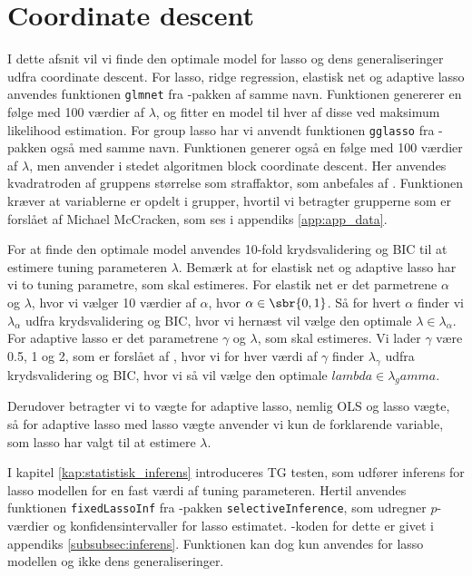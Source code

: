\section{Coordinate descent}
I dette afsnit vil vi finde den optimale model for lasso og dens generaliseringer udfra coordinate descent.
For lasso, ridge regression, elastisk net og adaptive lasso anvendes funktionen \texttt{glmnet} fra \Rlang-pakken af samme navn.
Funktionen genererer en følge med 100 værdier af $\lambda$, og fitter en model til hver af disse ved maksimum likelihood estimation.
For group lasso har vi anvendt funktionen \texttt{gglasso} fra \Rlang-pakken også med samme navn. 
Funktionen generer også en følge med 100 værdier af $\lambda$, men anvender i stedet algoritmen block coordinate descent. Her anvendes kvadratroden af gruppens størrelse som straffaktor, som anbefales af \citep{group_lasso}.
Funktionen kræver at variablerne er opdelt i grupper, hvortil vi betragter grupperne som er forslået af Michael McCracken, som ses i appendiks \ref{app:app_data}. 

For at finde den optimale model anvendes 10-fold krydsvalidering og BIC til at estimere tuning parameteren $\lambda$.
Bemærk at for elastisk net og adaptive lasso har vi to tuning parametre, som skal estimeres. 
For elastik net er det parmetrene $\alpha$ og $\lambda$, hvor vi vælger 10 værdier af \(\alpha\), hvor $\alpha \in \sbr{0,1}$.  Så for hvert  \(\alpha\) finder vi \(\lambda_\alpha\) udfra krydsvalidering og BIC, hvor vi hernæst vil vælge den optimale $\lambda \in \lambda_{\alpha}$.  
For adaptive lasso er det parametrene $\gamma$ og $\lambda$, som skal estimeres.
Vi lader $\gamma$ være 0.5, 1 og 2, som er forslået af \citep{adaptive_lasso}, hvor vi for hver værdi af $\gamma$ finder \(\lambda_\gamma\) udfra krydsvalidering og BIC, hvor vi så vil vælge den optimale $lambda \in \lambda_gamma$.

Derudover betragter vi to vægte for adaptive lasso, nemlig OLS og lasso vægte, så for adaptive lasso med lasso vægte anvender vi kun de forklarende variable, som lasso har valgt til at estimere $\lambda$. 

I kapitel \ref{kap:statistisk_inferens} introduceres TG testen, som udfører inferens for lasso modellen for en fast værdi af tuning parameteren.
Hertil anvendes funktionen \texttt{fixedLassoInf} fra \Rlang-pakken \texttt{selectiveInference}, som udregner \(p\)-værdier og konfidensintervaller for lasso estimatet.
\Rlang-koden for dette er givet i appendiks \ref{subsubsec:inferens}.
Funktionen kan dog kun anvendes for lasso modellen og ikke dens generaliseringer. 







